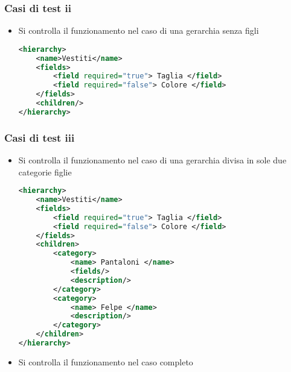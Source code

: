 \begin{frame}[fragile]
    \frametitle{Casi di test ii}
    \lstset{style=java}
    \begin{itemize}
        \item <1-> Si controlla il funzionamento nel caso di una gerarchia senza figli
\begin{lstlisting}[language=xml]
<hierarchy>
    <name>Vestiti</name>
    <fields>
        <field required="true"> Taglia </field>
        <field required="false"> Colore </field>
    </fields>
    <children/>
</hierarchy>
\end{lstlisting}
    \end{itemize}
\end{frame}
\note{
    
}

\disablefooter
\begin{frame}[fragile]
    \frametitle{Casi di test iii}
    \lstset{style=tiny_java}
    \begin{itemize}
        \item <1-> Si controlla il funzionamento nel caso di una gerarchia divisa in sole due categorie figlie
\begin{lstlisting}[language=xml]
<hierarchy>
    <name>Vestiti</name>
    <fields>
        <field required="true"> Taglia </field>
        <field required="false"> Colore </field>
    </fields>
    <children>
        <category>
            <name> Pantaloni </name>
            <fields/>
            <description/>
        </category>
        <category>
            <name> Felpe </name>
            <description/>
        </category>
    </children>
</hierarchy>
\end{lstlisting}
        \item <2-> Si controlla il funzionamento nel caso completo
    \end{itemize}
\end{frame}
\note{
    
}
\enablefooter

